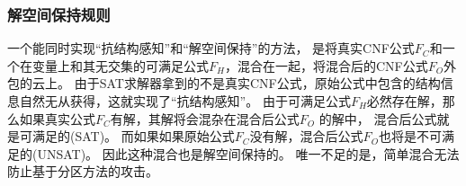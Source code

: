 \subsubsection{解空间保持规则}


一个能同时实现“抗结构感知”和“解空间保持”的方法，
是将真实CNF公式$F_C$和一个在变量上和其无交集的可满足公式$F_H$，混合在一起，将混合后的CNF公式$F_O$外包的云上。
由于SAT求解器拿到的不是真实CNF公式，原始公式中包含的结构信息自然无从获得，这就实现了“抗结构感知”。
由于可满足公式$F_H$必然存在解，那么如果真实公式$F_C$有解，其解将会混杂在混合后公式$F_O$ 的解中，
混合后公式就是可满足的(SAT)。
而如果如果原始公式$F_C$没有解，混合后公式$F_O$也将是不可满足的(UNSAT)。
因此这种混合也是解空间保持的。
唯一不足的是，简单混合无法防止基于分区方法的攻击。


